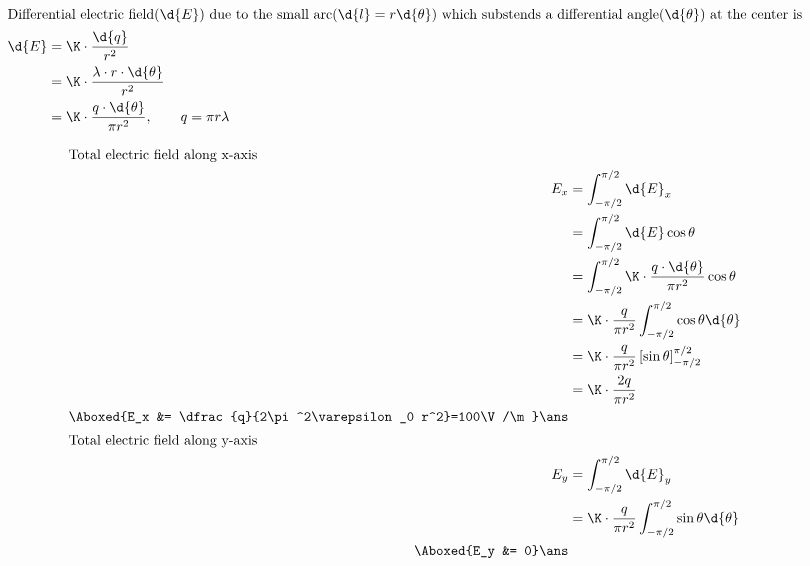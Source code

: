 \documentclass{article}
\begin{document}
\addtolength{\jot}{2ex}

\begin{align*}
\intertext{Differential electric field($\d{E}$) due to the small arc($\d{l}=r\d{\theta}$) which substends a differential angle($\d{\theta}$) at the center is}
\d{E} &= \K \cdot \dfrac{\d{q}}{r^2}\\
	&= \K \cdot \dfrac{\lambda \cdot r \cdot\d{\theta}}{r^2}\\
	&= \K \cdot \dfrac{q \cdot\d{\theta}}{\pi r^2} ,\quad\quad q=\pi r\lambda
\end{align*}
\pagebreak

\def\I{\int_{-\pi/2}^{\pi/2}}
\begin{align*}
\intertext{Total electric field along x-axis}
E_x &= \I \d{E}_x\\
	&= \I \d{E}\cos\theta\\
	&= \I \K \cdot \dfrac{q \cdot\d{\theta}}{\pi r^2} \cos\theta\\
	&= \K \cdot \dfrac{q}{\pi r^2} \I \cos\theta \d{\theta}\\
	&= \K \cdot \dfrac{q}{\pi r^2} \left[\sin\theta \right]_{-\pi/2}^{\pi/2}\\
	&= \K \cdot \dfrac{2q}{\pi r^2}\\
\Aboxed{E_x &= \dfrac{q}{2\pi^2\varepsilon_0 r^2}=100\V/\m}\ans\\
\intertext{Total electric field along y-axis}
E_y &= \I \d{E}_y\\
	&= \K \cdot \dfrac{q}{\pi r^2} \I \sin\theta \d{\theta}\\
\Aboxed{E_y &= 0}\ans
\end{align*}

\pagebreak

\vspace*{\fill}
\begin{center}
	\fbox{\qrcode[height=2cm]{\gdrive}}
\end{center}
\vspace*{\fill}
\end{document}
